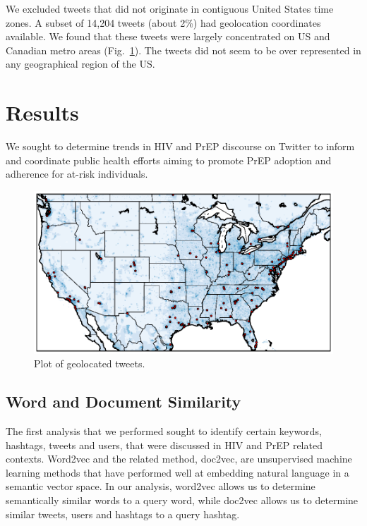 \documentclass[conference]{IEEEtran}
\begin{document}
We excluded tweets that did not originate in contiguous United States time zones. A subset of 14,204 tweets (about 2\%) had geolocation coordinates available. We found that these tweets were largely concentrated on US and Canadian metro areas (Fig.~\ref{fig:map}). The tweets did not seem to be over represented in any geographical region of the US.

\section{Results}

We sought to determine trends in HIV and PrEP discourse on Twitter to inform and coordinate public health efforts aiming to promote PrEP adoption and adherence for at-risk individuals. 

\begin{figure}
\centering
\includegraphics[scale=0.35]{figs/Fig1}
\caption{Plot of geolocated tweets.}
\label{fig:map}
\end{figure}

\subsection{Word and Document Similarity}

The first analysis that we performed sought to identify certain keywords, hashtags, tweets and users, that were discussed in HIV and PrEP related contexts. Word2vec and the related method, doc2vec, are unsupervised machine learning methods that have performed well at embedding natural language in a semantic vector space. In our analysis, word2vec allows us to determine semantically similar words to a query word, while doc2vec allows us to determine similar tweets, users and hashtags to a query hashtag.
\end{document}
